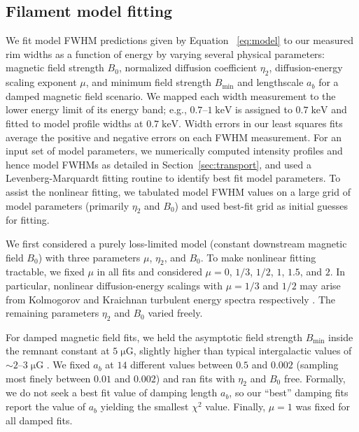 \documentclass[manuscript]{aastex}  %
\newcommand*{\mt}{\mathrm}
\newcommand*{\unit}[1]{\;\mt{#1}}  %
\newcommand*{\abt}{\mathord{\sim}} %
\newcommand*{\Bmin}{B_{\mt{min}}}
\newcommand*{\muG}{\unit{\mu G}}
\begin{document}
\subsection{Filament model fitting}
\label{sec:fits}

We fit model FWHM predictions given by Equation~ \eqref{eq:model} to our
measured rim widths as a function of energy by varying several physical
parameters: magnetic field strength $B_0$, normalized diffusion coefficient
$\eta_2$, diffusion-energy scaling exponent $\mu$, and minimum field strength
$\Bmin$ and lengthscale $a_b$ for a damped magnetic field scenario.  We
mapped each width measurement to the lower energy limit of its energy band;
e.g., $0.7$--$1 \unit{keV}$ is assigned to $0.7 \unit{keV}$ and fitted to model
profile widths at $0.7 \unit{keV}$.  Width errors in our least squares fits
average the positive and negative errors on each FWHM measurement.  For an
input set of model parameters, we numerically computed intensity profiles and
hence model FWHMs as detailed in Section~\ref{sec:transport}, and used a
Levenberg-Marquardt fitting routine to identify best fit model parameters.
To assist the nonlinear fitting, we tabulated model FWHM values on a large grid
of model parameters (primarily $\eta_2$ and $B_0$) and used best-fit grid as
initial guesses for fitting.

We first considered a purely loss-limited model (constant downstream magnetic
field $B_0$) with three parameters $\mu$, $\eta_2$, and $B_0$.  To make
nonlinear fitting tractable, we fixed $\mu$ in all fits and considered $\mu =
0$, $1/3$, $1/2$, $1$, $1.5$, and $2$.  In particular, nonlinear
diffusion-energy scalings with $\mu = 1/3$ and $1/2$ may arise from Kolmogorov
and Kraichnan turbulent energy spectra respectively \citep{reynolds2004}.  The
remaining parameters $\eta_2$ and $B_0$ varied freely.

For damped magnetic field fits, we held the asymptotic field strength
$\Bmin$ inside the remnant constant at $5 \muG$, slightly higher than
typical intergalactic values of $\abt 2$--$3 \muG$ \citep{lyne1989, han2006}.
We fixed $a_b$ at $14$ different values between $0.5$ and $0.002$ (sampling
most finely between $0.01$ and $0.002$) and ran fits with $\eta_2$ and $B_0$
free.  Formally, we do not seek a best fit value of damping length $a_b$, so
our ``best'' damping fits report the value of $a_b$ yielding the smallest
$\chi^2$ value.  Finally, $\mu = 1$ was fixed for all damped fits.
\end{document}

